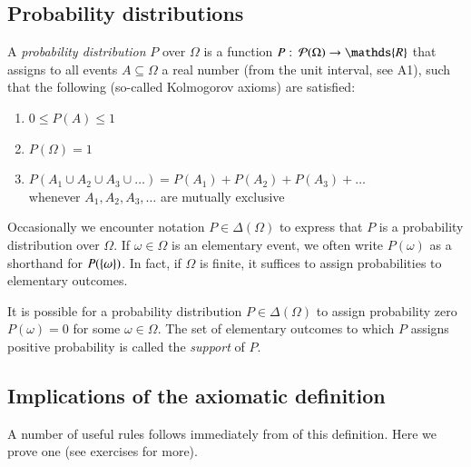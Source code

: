 \documentclass[nobib,nofonts]{tufte-handout}
\renewcommand{\markdef}[1]{\emph{#1}}
\begin{document}
\subsection{Probability distributions}

A \markdef{probability distribution} $P$ over $\Omega$ is a function
$P \mycolon \pow{\Omega} \rightarrow \mathds{R}$ that assigns to all events
$A \subseteq \Omega$ a real number (from the unit interval, see A1), such that the following
(so-called Kolmogorov axioms) are satisfied:
\begin{enumerate}[{A}1.]
\item $0 \le P(A) \le 1$
\item $P(\Omega) = 1$
\item $P(A_1 \cup A_2 \cup A_3 \cup \dots) = P(A_1) + P(A_2) + P(A_3) + \dots $ \\
  whenever $A_1, A_2, A_3, \dots$ are mutually exclusive
\end{enumerate}
Occasionally we encounter notation $P \in \Delta(\Omega)$ to express that $P$ is a probability
distribution over $\Omega$. If $\omega \in \Omega$ is an elementary event,
we often write $P(\omega)$ as a shorthand for $P(\left\{\omega\right\})$. In fact, if $\Omega$ is
finite, it suffices to assign probabilities to elementary outcomes.

It is possible for a probability distribution $P \in \Delta(\Omega)$ to assign probability zero $P(\omega) = 0$ for some $\omega \in \Omega$.
The set of elementary outcomes to which $P$ assigns positive probability is called the \emph{support} of $P$.

\subsection{Implications of the axiomatic definition}

A number of useful rules follows immediately from of this definition.
Here we prove one (see exercises for more).
\end{document}
